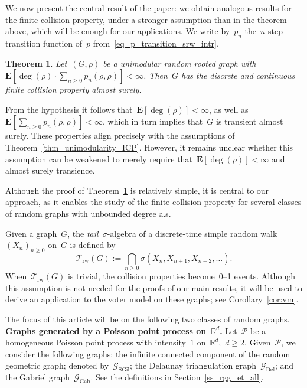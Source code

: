 \documentclass[a4paper,11pt]{article}
\newcommand{\RR}{\mathbb{R}}
\newtheorem{theorem}{Theorem}
\theoremstyle{definition}
\begin{document}
We now present the central result of the paper: we obtain analogous results for the finite collision property, under a stronger assumption than in the theorem above, which will be enough for our applications. We write by~$p_n$ the~$n$-step transition function of~$p$ from~\eqref{eq_p_transition_srw_intr}.

\begin{theorem}\label{thm_unimodularity_FCP}
Let~$(G,\rho)$ be a unimodular random rooted graph with~$\mathbf E[ \deg(\rho) \cdot \sum_{n \ge 0} p_n(\rho,\rho) ] <  \infty$. Then~$G$ has the discrete and continuous finite collision property almost surely. 
\end{theorem}
From the hypothesis it follows that~$\mathbf{E}[\deg(\rho)]<\infty$, as well as~$\mathbf{E}[\sum_{n \ge 0} p_n(\rho,\rho) ]<\infty$, which in turn implies that~$G$ is transient almost surely. These properties align precisely with the assumptions of Theorem~\ref{thm_unimodularity_ICP}. However, it remains unclear whether this assumption can be weakened to merely require that~$\mathbf{E}[\deg(\rho)]<\infty$ and almost surely transience. 

Although the proof of Theorem~\ref{thm_unimodularity_FCP} is relatively simple, it is central to our approach, as it enables the study of the finite collision property for several classes of random graphs with unbounded degree a.s. 

Given a graph~$G$, the \emph{tail}~$\sigma$-algebra of a discrete-time simple random walk~$(X_n)_{n \ge 0}$ on~$G$ is defined by
$$\mathcal T_\mathrm{rw}(G) := \bigcap_{n \ge 0} \sigma( X_n,X_{n+1},X_{n+2},\dots ).$$
When~$\mathcal T_\mathrm{rw}(G)$ is trivial, the collision properties become~0--1 events. Although this assumption is not needed for the proofs of our main results, it will be used to derive an application to the voter model on these graphs; see Corollary~\ref{cor:vm}.

The focus of this article will be on the following two classes of random graphs. \\[-1.5mm]

\noindent \textbf{Graphs generated by a Poisson point process on~$\RR^d$.} Let~$\mathcal P$ be a homogeneous Poisson point process with intensity~$1$ on~$\RR^d$,~$d \ge 2$. Given~$\mathcal P$, we consider the following graphs: the infinite connected component of the random geometric graph; denoted by~$\mathcal G_\mathrm{SGil}$; the Delaunay triangulation graph~$\mathcal G_\mathrm{Del}$; and the Gabriel graph~$\mathcal G_\mathrm{Gab}$. See the definitions in Section~\ref{ss_rgg_et_all}. 
\end{document}

